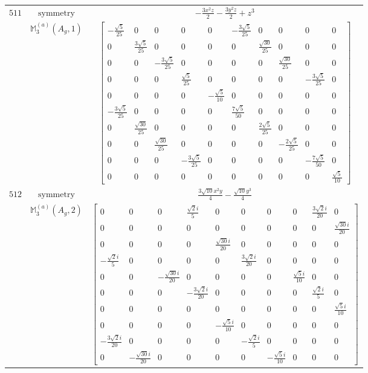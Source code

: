 \documentclass[fleqn,8pt,landscape]{jsarticle}
\begin{document}
\begin{longtable}{ccc}
$ 511 $ & $ \text{symmetry} $ & $ - \frac{3 x^{2} z}{2} - \frac{3 y^{2} z}{2} + z^{3} $ \\
$  $ & $ \mathbb{M}_{3}^{(a)}(A_{g},1) $ & $ \begin{bmatrix} - \frac{\sqrt{5}}{25} & 0 & 0 & 0 & 0 & - \frac{3 \sqrt{5}}{25} & 0 & 0 & 0 & 0 \\ 0 & \frac{3 \sqrt{5}}{25} & 0 & 0 & 0 & 0 & \frac{\sqrt{30}}{25} & 0 & 0 & 0 \\ 0 & 0 & - \frac{3 \sqrt{5}}{25} & 0 & 0 & 0 & 0 & \frac{\sqrt{30}}{25} & 0 & 0 \\ 0 & 0 & 0 & \frac{\sqrt{5}}{25} & 0 & 0 & 0 & 0 & - \frac{3 \sqrt{5}}{25} & 0 \\ 0 & 0 & 0 & 0 & - \frac{\sqrt{5}}{10} & 0 & 0 & 0 & 0 & 0 \\ - \frac{3 \sqrt{5}}{25} & 0 & 0 & 0 & 0 & \frac{7 \sqrt{5}}{50} & 0 & 0 & 0 & 0 \\ 0 & \frac{\sqrt{30}}{25} & 0 & 0 & 0 & 0 & \frac{2 \sqrt{5}}{25} & 0 & 0 & 0 \\ 0 & 0 & \frac{\sqrt{30}}{25} & 0 & 0 & 0 & 0 & - \frac{2 \sqrt{5}}{25} & 0 & 0 \\ 0 & 0 & 0 & - \frac{3 \sqrt{5}}{25} & 0 & 0 & 0 & 0 & - \frac{7 \sqrt{5}}{50} & 0 \\ 0 & 0 & 0 & 0 & 0 & 0 & 0 & 0 & 0 & \frac{\sqrt{5}}{10} \end{bmatrix} $ \\ \hline
$ 512 $ & $ \text{symmetry} $ & $ \frac{3 \sqrt{10} x^{2} y}{4} - \frac{\sqrt{10} y^{3}}{4} $ \\
$  $ & $ \mathbb{M}_{3}^{(a)}(A_{g},2) $ & $ \begin{bmatrix} 0 & 0 & 0 & \frac{\sqrt{2} i}{5} & 0 & 0 & 0 & 0 & \frac{3 \sqrt{2} i}{20} & 0 \\ 0 & 0 & 0 & 0 & 0 & 0 & 0 & 0 & 0 & \frac{\sqrt{30} i}{20} \\ 0 & 0 & 0 & 0 & \frac{\sqrt{30} i}{20} & 0 & 0 & 0 & 0 & 0 \\ - \frac{\sqrt{2} i}{5} & 0 & 0 & 0 & 0 & \frac{3 \sqrt{2} i}{20} & 0 & 0 & 0 & 0 \\ 0 & 0 & - \frac{\sqrt{30} i}{20} & 0 & 0 & 0 & 0 & \frac{\sqrt{5} i}{10} & 0 & 0 \\ 0 & 0 & 0 & - \frac{3 \sqrt{2} i}{20} & 0 & 0 & 0 & 0 & \frac{\sqrt{2} i}{5} & 0 \\ 0 & 0 & 0 & 0 & 0 & 0 & 0 & 0 & 0 & \frac{\sqrt{5} i}{10} \\ 0 & 0 & 0 & 0 & - \frac{\sqrt{5} i}{10} & 0 & 0 & 0 & 0 & 0 \\ - \frac{3 \sqrt{2} i}{20} & 0 & 0 & 0 & 0 & - \frac{\sqrt{2} i}{5} & 0 & 0 & 0 & 0 \\ 0 & - \frac{\sqrt{30} i}{20} & 0 & 0 & 0 & 0 & - \frac{\sqrt{5} i}{10} & 0 & 0 & 0 \end{bmatrix} $ \\ \hline

\end{longtable}
\end{document}

